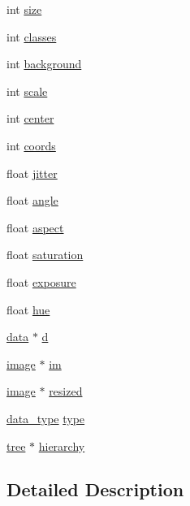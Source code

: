 \begin{DoxyCompactItemize}
\item 
int \mbox{\hyperlink{structload__args_a57fbd5eb4f1b223ad19b5324fa01b184}{size}}
\item 
int \mbox{\hyperlink{structload__args_af12ce52f9bf54ea7985cb0e9b9dfaf55}{classes}}
\item 
int \mbox{\hyperlink{structload__args_a05d8a43c38b9e069a854cc6a7c7625db}{background}}
\item 
int \mbox{\hyperlink{structload__args_a27932099db4ddca9b7ca717f92891a44}{scale}}
\item 
int \mbox{\hyperlink{structload__args_a84a09ba4d910b1129e92dd91fa01d6f0}{center}}
\item 
int \mbox{\hyperlink{structload__args_a8db147261d62a355ba735d96f99ada43}{coords}}
\item 
float \mbox{\hyperlink{structload__args_ad446757635db989216a02b331d254906}{jitter}}
\item 
float \mbox{\hyperlink{structload__args_a6cc2a92701869043348a92cb810edbbd}{angle}}
\item 
float \mbox{\hyperlink{structload__args_a0077414b1db970d5eecfc2c756fc328b}{aspect}}
\item 
float \mbox{\hyperlink{structload__args_ad478a463de03972022a6c6f89c7c4912}{saturation}}
\item 
float \mbox{\hyperlink{structload__args_a3db966b80533d8c5003372710f9e8632}{exposure}}
\item 
float \mbox{\hyperlink{structload__args_a37e3681f1edc871b1e15432f08d00114}{hue}}
\item 
\mbox{\hyperlink{structdata}{data}} $\ast$ \mbox{\hyperlink{structload__args_a0b1c4f762d67a0f0cbcc1241cfa5463d}{d}}
\item 
\mbox{\hyperlink{structimage}{image}} $\ast$ \mbox{\hyperlink{structload__args_ac821b75a2e615c801b67a73911dd0134}{im}}
\item 
\mbox{\hyperlink{structimage}{image}} $\ast$ \mbox{\hyperlink{structload__args_aa9dc3e3e93a6031df60420a5cb36c508}{resized}}
\item 
\mbox{\hyperlink{darknet_8h_ac2ad7f431e3446fddcd9b6b9f93c4c14}{data\+\_\+type}} \mbox{\hyperlink{structload__args_a281729b932cef85bb4e2a88e1133518d}{type}}
\item 
\mbox{\hyperlink{structtree}{tree}} $\ast$ \mbox{\hyperlink{structload__args_a2c1866cf8b94474f3f8416a1e0f0cf91}{hierarchy}}
\end{DoxyCompactItemize}


\subsection{Detailed Description}



